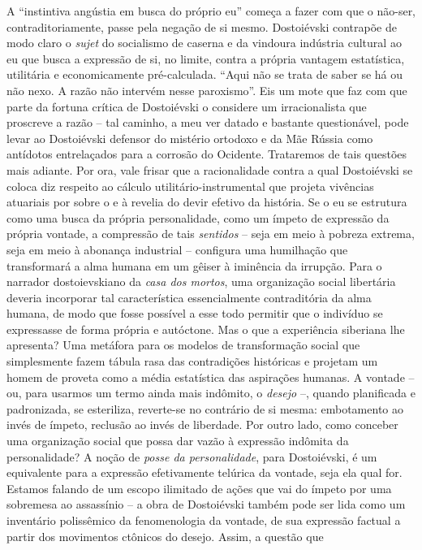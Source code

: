 A ``instintiva angústia em busca do próprio eu'' começa a fazer com que
o não-ser, contraditoriamente, passe pela negação de si mesmo.
Dostoiévski contrapõe de modo claro o \emph{sujet} do socialismo de
caserna e da vindoura indústria cultural ao eu que busca a expressão de
si, no limite, contra a própria vantagem estatística, utilitária e
economicamente pré-calculada. ``Aqui não se trata de saber se há ou não
nexo. A razão não intervém nesse paroxismo''. Eis um mote que faz com
que parte da fortuna crítica de Dostoiévski o considere um
irracionalista que proscreve a razão -- tal caminho, a meu ver datado e
bastante questionável, pode levar ao Dostoiévski defensor do mistério
ortodoxo e da Mãe Rússia como antídotos entrelaçados para a corrosão do
Ocidente. Trataremos de tais questões mais adiante. Por ora, vale frisar
que a racionalidade contra a qual Dostoiévski se coloca diz respeito ao
cálculo utilitário-instrumental que projeta vivências atuariais por
sobre o e à revelia do devir efetivo da história. Se o eu se estrutura
como uma busca da própria personalidade, como um ímpeto de expressão da
própria vontade, a compressão de tais \emph{sentidos} -- seja em meio à
pobreza extrema, seja em meio à abonança industrial -- configura uma
humilhação que transformará a alma humana em um gêiser à iminência da
irrupção. Para o narrador dostoievskiano da \emph{casa dos mortos}, uma
organização social libertária deveria incorporar tal característica
essencialmente contraditória da alma humana, de modo que fosse possível
a esse todo permitir que o indivíduo se expressasse de forma própria e
autóctone. Mas o que a experiência siberiana lhe apresenta? Uma metáfora
para os modelos de transformação social que simplesmente fazem tábula
rasa das contradições históricas e projetam um homem de proveta como a
média estatística das aspirações humanas. A vontade -- ou, para usarmos
um termo ainda mais indômito, o \emph{desejo} --, quando planificada e
padronizada, se esteriliza, reverte-se no contrário de si mesma:
embotamento ao invés de ímpeto, reclusão ao invés de liberdade. Por
outro lado, como conceber uma organização social que possa dar vazão à
expressão indômita da personalidade? A noção de \emph{posse da
personalidade}, para Dostoiévski, é um equivalente para a expressão
efetivamente telúrica da vontade, seja ela qual for. Estamos falando de
um escopo ilimitado de ações que vai do ímpeto por uma sobremesa ao
assassínio -- a obra de Dostoiévski também pode ser lida como um
inventário polissêmico da fenomenologia da vontade, de sua expressão
factual a partir dos movimentos ctônicos do desejo. Assim, a questão que
